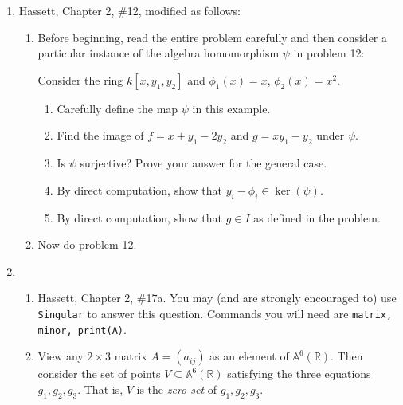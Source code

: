 \documentclass[11pt]{report}
\newcommand\RR{{\mathbb R}}
\newcommand\A{{\mathbb A}}
\begin{document}
\enlargethispage{.5cm}


\vskip 1cm

\begin{enumerate}

\item  Hassett, Chapter 2, \#12, modified as follows:

\begin{enumerate}

\item Before beginning, read the entire problem carefully and
then consider a particular instance of the algebra homomorphism $\psi$ in problem 12:

\smallskip

Consider the ring $k[x,y_1,y_2]$ and $\phi_1(x) = x$, $\phi_2(x) = x^2$.  

\begin{enumerate}

\item Carefully define the map $\psi$ in this example.

\item Find the image of $f = x + y_1 - 2y_2$ and $g = xy_1 - y_2$ under $\psi$.

\item Is $\psi$ surjective?  Prove your answer for the general case.

\item By direct computation, show that $y_i - \phi_i \in \ker (\psi)$.

\item By direct computation, show that $g \in I$ as defined in the problem.

\end{enumerate}

\item Now do problem 12.

\end{enumerate}

\item 

\begin{enumerate}

\item Hassett, Chapter 2, \#17a.  You may (and are strongly encouraged to) use {\tt Singular} to answer this question.
Commands you will need are {\tt matrix, minor, print(A)}.

\item View any $2 \times 3$ matrix $A = (a_{ij})$ as an element of $\A^6(\RR)$.   Then consider
the set of points $V \subseteq \A^6(\RR)$ satisfying the three equations $g_1, g_2, g_3$.  That is,
$V$ is the \emph{zero set} of $g_1, g_2, g_3$.


\end{enumerate}
\end{enumerate}
\end{document}
